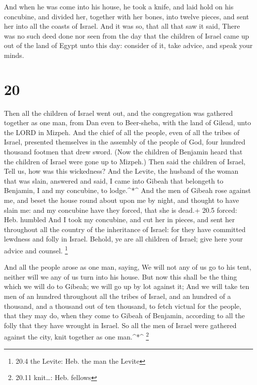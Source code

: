  And when he was come into his house, he took a knife, and
laid hold on his concubine, and divided her, together with her bones,
into twelve pieces, and sent her into all the coasts of Israel.
 And it was so, that all that saw it said, There was no
such deed done nor seen from the day that the children of Israel came up
out of the land of Egypt unto this day: consider of it, take advice, and
speak your minds.

\hypertarget{section-19}{%
\section{20}\label{section-19}}

 Then all the children of Israel went out, and the
congregation was gathered together as one man, from Dan even to
Beer-sheba, with the land of Gilead, unto the LORD in Mizpeh.
 And the chief of all the people, even of all the tribes of
Israel, presented themselves in the assembly of the people of God, four
hundred thousand footmen that drew sword.  (Now the children
of Benjamin heard that the children of Israel were gone up to Mizpeh.)
Then said the children of Israel, Tell us, how was this wickedness?
 And the Levite, the husband of the woman that was slain,
answered and said, I came into Gibeah that belongeth to Benjamin, I and
my concubine, to lodge.\^{}*\^{}  And the men of Gibeah rose
against me, and beset the house round about upon me by night, and
thought to have slain me: and my concubine have they forced, that she is
dead.+ 20.5 forced: Heb. humbled  And I took my concubine,
and cut her in pieces, and sent her throughout all the country of the
inheritance of Israel: for they have committed lewdness and folly in
Israel.  Behold, ye are all children of Israel; give here
your advice and counsel. \footnote{20.4 the Levite: Heb. the man the
  Levite}

 And all the people arose as one man, saying, We will not
any of us go to his tent, neither will we any of us turn into his house.
 But now this shall be the thing which we will do to Gibeah;
we will go up by lot against it;  And we will take ten men
of an hundred throughout all the tribes of Israel, and an hundred of a
thousand, and a thousand out of ten thousand, to fetch victual for the
people, that they may do, when they come to Gibeah of Benjamin,
according to all the folly that they have wrought in Israel.
 So all the men of Israel were gathered against the city,
knit together as one man.\^{}*\^{} \footnote{20.11 knit\ldots: Heb.
  fellows}

